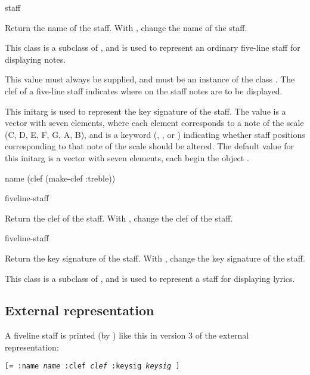  {staff}

Return the name of the staff.  With , change the name of
the staff.


This class is a subclass of , and is used to represent an
ordinary five-line staff for displaying notes. 


This value must always be supplied, and must be an instance of the
class .  The clef of a five-line staff indicates where
on the staff notes are to be displayed.  


This initarg is used to represent the key signature of the staff.  The
value is a vector with seven elements, where each element corresponds
to a note of the scale (C, D, E, F, G, A, B), and is a keyword
(, , or ) indicating
whether staff positions corresponding to that note of the scale should
be altered.  The default value for this initarg is a vector with seven
elements, each begin the object .

 {name \optional (clef \lispobj(make-clef :treble))}

 {fiveline-staff}

Return the clef of the staff.  With , change the clef of
the staff.

 {fiveline-staff}

Return the key signature of the staff.  With , change
the key signature of the staff. 


This class is a subclass of , and is used to represent a
staff for displaying lyrics. 

\subsection{External representation}

A fiveline staff is printed (by ) like this in
version 3 of the external representation:

\texttt{[= :name \textit{name} :clef \textit{clef} :keysig \textit{keysig} ]}

